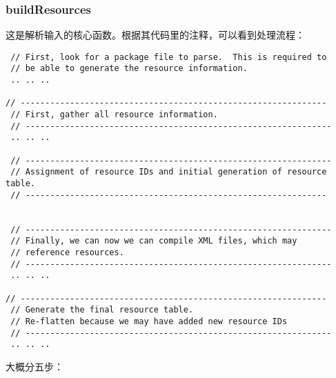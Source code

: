 \documentclass[a4paper,11pt]{article}
\begin{document}
\subsubsection{buildResources}\label{buildres}
这是解析输入的核心函数。根据其代码里的注释，可以看到处理流程：
\begin{lstlisting}
 // First, look for a package file to parse.  This is required to
 // be able to generate the resource information.
 .. .. ..
 
// --------------------------------------------------------------
 // First, gather all resource information.
 // --------------------------------------------------------------
 .. .. ..  

 // --------------------------------------------------------------
 // Assignment of resource IDs and initial generation of resource table.
 // -------------------------------------------------------------


 // --------------------------------------------------------------
 // Finally, we can now we can compile XML files, which may 
 // reference resources.
 // -------------------------------------------------------------- 
 .. .. ..

// --------------------------------------------------------------
 // Generate the final resource table.
 // Re-flatten because we may have added new resource IDs
 // -------------------------------------------------------------- 
 .. .. ..
\end{lstlisting}
大概分五步：
\end{document}
